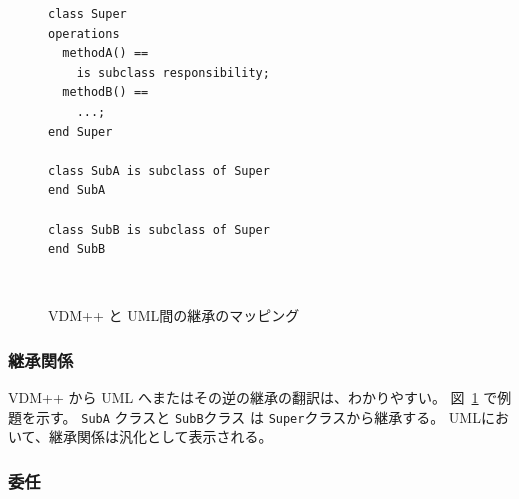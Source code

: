 \documentclass[\pformat,12pt]{jarticle}
\newcommand{\vdmpp}{VDM++}
\begin{document}
\begin{figure}[h]
\vspace{1cm}
\begin{center}
\begin{minipage}[h]{2.5in}
\begin{verbatim}  
class Super  
operations
  methodA() ==  
    is subclass responsibility;  
  methodB() ==  
    ...;  
end Super  
  
class SubA is subclass of Super  
end SubA  
  
class SubB is subclass of Super  
end SubB  
\end{verbatim}
\end{minipage} \ \
\hspace{1cm}
\begin{minipage}[h]{2.5in}
\vspace{1cm}
\end{minipage}
\caption{\vdmpp{} と UML間の継承のマッピング　\label{fig:super}}
\end{center}
\end{figure}

\subsubsection*{継承関係}
\label{inheritance}

 \vdmpp{} から UML へまたはその逆の継承の翻訳は、わかりやすい。
図~\ref{fig:super} で例題を示す。
{\tt SubA} クラスと {\tt SubB}クラス は {\tt Super}クラスから継承する。
UMLにおいて、継承関係は汎化として表示される。
  
\subsubsection*{委任}
\end{document}
